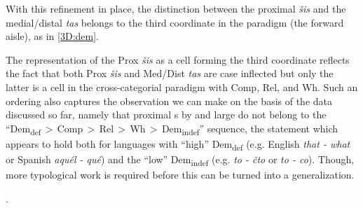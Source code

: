 With this refinement in place, the distinction between the  proximal \textit{\v{s}is} and the medial/distal \textit{tas} belongs to the third coordinate in the paradigm (the forward aisle), as in \ref{3D:dem}.
\par
 The representation of the Prox \textit{\v{s}is} as a cell forming the third coordinate reflects the fact that both Prox \textit{\v{s}is} and Med/Dist \textit{tas} are case inflected but only the latter is a cell in the cross-categorial paradigm with Comp, Rel, and Wh. 
Such an ordering also captures the observation we can make on the basis of the data discussed so far, namely that proximal s by and large do not belong to the ``Dem\textsubscript{def}\,$>$\,Comp\,$>$\,Rel\,$>$\,Wh\,$>$\,Dem\textsubscript{indef}'' sequence, the statement which appears to hold both for languages with ``high'' Dem\textsubscript{def}  (e.g. English \textit{that - what} or  Spanish \textit{aqu\'el - qu\'e}) and the ``low'' Dem\textsubscript{indef} (e.g.  \textit{to - \v{c}to} or  \textit{to - co}). Though, more typological work is required before this can be turned into a generalization.\pagebreak

\ex.\label{3D:dem}

